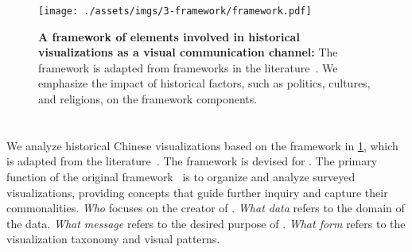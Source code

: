 \begin{figure}[!ht]
    \centering
    \texttt{[image: ./assets/imgs/3-framework/framework.pdf]}
    \caption{
        \textbf{A framework of elements involved in historical visualizations as a visual communication channel:}
        The framework is adapted from frameworks in the literature~\cite{Zhang2021Mapping, Munzner2009Nested,Lasswell1948Structure}.
        We emphasize the impact of historical factors, such as politics, cultures, and religions, on the framework components.
    }
    \label{fig:framework}
\end{figure}

\section{}
\label{sec:zuantuset}

We analyze historical Chinese visualizations based on the framework in \cref{fig:framework}, which is adapted from the literature~\cite{Zhang2021Mapping,Munzner2009Nested,Lasswell1948Structure}.
The framework is devised for .
The primary function of the original framework~\cite{Zhang2021Mapping} is to organize and analyze surveyed visualizations, providing concepts that guide further inquiry and capture their commonalities.
\emph{Who} focuses on the creator of \itemTypePlural.
\emph{What data} refers to the domain of the data.
\emph{What message} refers to the desired purpose of \itemTypePlural.
\emph{What form} refers to the visualization taxonomy and visual patterns.



